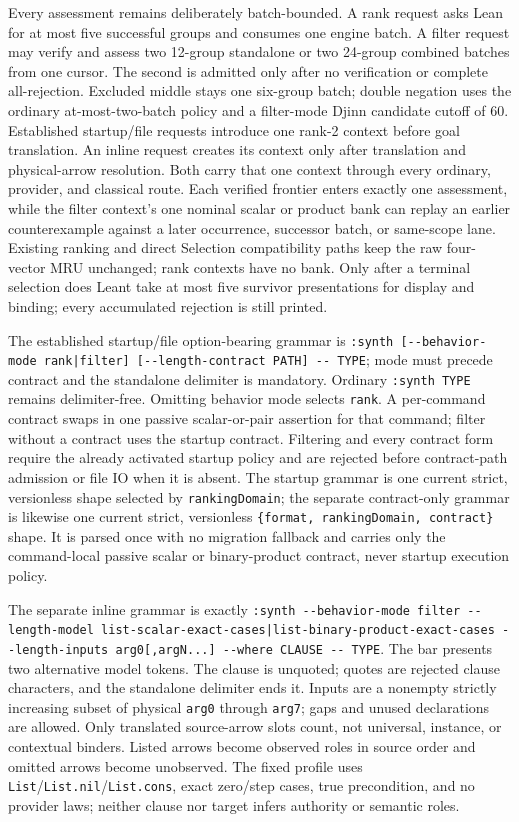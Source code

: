 \documentclass[11pt,oneside]{article}
\newcommand{\code}[1]{\texttt{#1}}
\begin{document}
Every assessment remains deliberately batch-bounded. A rank request asks Lean
for at most five successful groups and consumes one engine batch. A filter
request may verify and assess two 12-group standalone or two 24-group combined
batches from one cursor. The second is admitted only after no verification or
complete all-rejection. Excluded middle stays one six-group batch; double
negation uses the ordinary at-most-two-batch policy and a filter-mode Djinn
candidate cutoff of 60. Established startup/file requests introduce one
rank-2 context before goal translation. An inline request creates its context
only after translation and physical-arrow resolution. Both carry that one
context through every ordinary, provider, and classical route. Each verified frontier enters exactly
one assessment, while the filter context's one nominal scalar or product bank
can replay an earlier counterexample against a later occurrence, successor
batch, or same-scope lane. Existing ranking and direct Selection
compatibility paths keep the raw four-vector MRU unchanged; rank contexts have
no bank. Only after a terminal selection does Leant take at most five survivor
presentations for display and binding; every accumulated rejection is still
printed.

The established startup/file option-bearing grammar is
\code{:synth [-{}-behavior-mode rank|filter]
[-{}-length-contract PATH] -{}- TYPE}; mode must precede contract and the
standalone delimiter is mandatory. Ordinary \code{:synth TYPE} remains
delimiter-free. Omitting behavior mode selects \code{rank}. A per-command
contract swaps in one passive scalar-or-pair assertion for that command;
filter without a contract uses the startup contract. Filtering and every
contract form require the already activated startup policy and are rejected
before contract-path admission or file IO when it is absent. The
startup grammar is one current strict, versionless shape selected by
\code{rankingDomain}; the separate contract-only grammar is likewise one
current strict, versionless \code{\{format, rankingDomain, contract\}} shape.
It is parsed once with no migration fallback and carries only the command-local
passive scalar or binary-product contract, never startup execution policy.

The separate inline grammar is exactly
\code{:synth -{}-behavior-mode filter -{}-length-model
list-scalar-exact-cases|list-binary-product-exact-cases
-{}-length-inputs arg0[,argN...] -{}-where CLAUSE -{}- TYPE}. The bar presents
two alternative model tokens. The clause is unquoted; quotes are rejected
clause characters, and the standalone delimiter ends it. Inputs are a nonempty
strictly increasing subset of physical \code{arg0} through \code{arg7}; gaps
and unused declarations are allowed. Only translated source-arrow slots count,
not universal, instance, or contextual binders. Listed arrows become observed
roles in source order and omitted arrows become unobserved. The fixed profile
uses \code{List}/\code{List.nil}/\code{List.cons}, exact zero/step cases, true
precondition, and no provider laws; neither clause nor target infers authority
or semantic roles.
\end{document}
